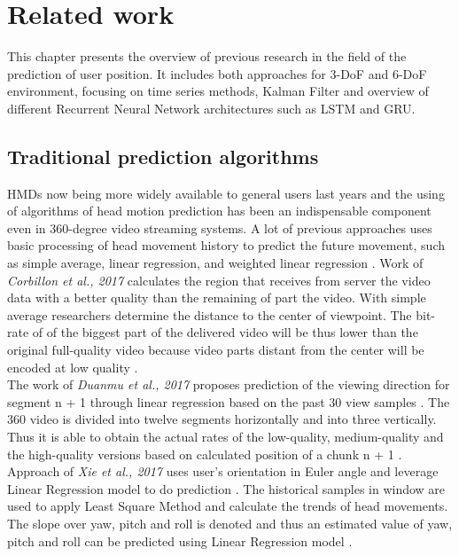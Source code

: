 \chapter{Related work}
\label{sec:related}
This chapter presents the overview of previous research in the field of the prediction of user position. It includes both approaches for 3-DoF and 6-DoF environment, focusing on time series methods, Kalman Filter and overview of different  Recurrent Neural Network architectures such as LSTM and GRU.  


\section{Traditional prediction algorithms}
\label{sec:related:timeseries}
HMDs now being more widely available to general users last years and the using of algorithms of head motion prediction has been an indispensable component even in 360-degree video streaming systems. A lot of previous approaches uses basic processing of head movement history to predict the future movement, such as simple average, linear regression, and weighted linear regression \cite{attention_saliency}. Work of \textit{Corbillon et al., 2017} calculates the region that receives from server the video data with a better quality than the remaining of part the video. With simple average researchers determine the distance to the center of viewpoint. The bit-rate of of the biggest part of the delivered video will be thus lower than the original full-quality video because video parts distant from the center will be encoded at low quality \cite{simple_average}.\\
The work of \textit{Duanmu et al., 2017} proposes prediction of the viewing direction for segment n + 1 through linear regression based on the past 30 view samples \cite{linreg1}. The 360 video is divided into twelve segments horizontally and into three vertically. Thus it is able to obtain the actual rates of the low-quality, medium-quality and the high-quality versions based on calculated position of a chunk n + 1 \cite{linreg1}.\\
Approach of \textit{Xie et al., 2017} uses user’s orientation in Euler angle and leverage Linear Regression model to do prediction \cite{linreg2}. The historical samples in window are used to apply Least Square Method and calculate the trends of head movements. The slope over yaw, pitch and roll is denoted and thus an estimated value of yaw, pitch and roll can be predicted using Linear Regression model \cite{linreg2}.\\

